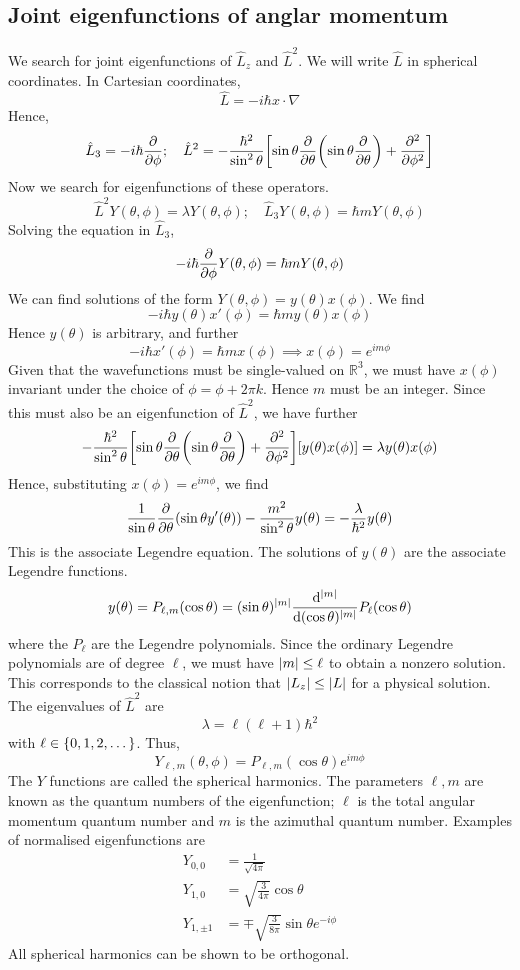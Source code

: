\subsection{Joint eigenfunctions of anglar momentum}
We search for joint eigenfunctions of \( \hat L_z \) and \( \hat L^2 \).
We will write \( \hat L \) in spherical coordinates.
In Cartesian coordinates,
\[
	\hat L = -i \hbar x \cdot \nabla
\]
Hence,
\[
	\hat L_3 = -i \hbar \pdv{\phi};\quad \hat L^2 = -\frac{\hbar^2}{\sin^2 \theta} \qty[\sin \theta \pdv{\theta} \qty(\sin \theta \pdv{\theta}) + \pdv[2]{\phi} ]
\]
Now we search for eigenfunctions of these operators.
\[
	\hat L^2 Y(\theta, \phi) = \lambda Y(\theta, \phi);\quad \hat L_3 Y(\theta, \phi) = \hbar m Y(\theta, \phi)
\]
Solving the equation in \( \hat L_3 \),
\[
	-i\hbar \pdv{\phi} Y(\theta, \phi) = \hbar m Y(\theta, \phi)
\]
We can find solutions of the form \( Y(\theta, \phi) = y(\theta)x(\phi) \).
We find
\[
	-i\hbar y(\theta) x'(\phi) = \hbar m y(\theta) x(\phi)
\]
Hence \( y(\theta) \) is arbitrary, and further
\[
	-i\hbar x'(\phi) = \hbar m x(\phi) \implies x(\phi) = e^{i m \phi}
\]
Given that the wavefunctions must be single-valued on \( \mathbb R^3 \), we must have \( x(\phi) \) invariant under the choice of \( \phi = \phi + 2\pi k \).
Hence \( m \) must be an integer.
Since this must also be an eigenfunction of \( \hat L^2 \), we have further
\[
	-\frac{\hbar^2}{\sin^2 \theta} \qty[\sin \theta \pdv{\theta} \qty(\sin \theta \pdv{\theta}) + \pdv[2]{\phi} ] [y(\theta) x(\phi)] = \lambda y(\theta) x(\phi)
\]
Hence, substituting \( x(\phi) = e^{i m \phi} \), we find
\[
	\frac{1}{\sin \theta} \pdv{\theta} \qty(\sin \theta y'(\theta)) - \frac{m^2}{\sin^2 \theta} y(\theta) = - \frac{\lambda}{\hbar^2} y(\theta)
\]
This is the associate Legendre equation.
The solutions of \( y(\theta) \) are the associate Legendre functions.
\[
	y(\theta) = P_{\ell,m}(\cos \theta) = (\sin \theta)^{\abs{m}} \dv[\abs{m}]{(\cos \theta)}  P_\ell(\cos \theta)
\]
where the \( P_\ell \) are the Legendre polynomials.
Since the ordinary Legendre polynomials are of degree \( \ell \), we must have \( \abs{m} \leq \ell \) to obtain a nonzero solution.
This corresponds to the classical notion that \( \abs{L_z} \leq \abs{L} \) for a physical solution.
The eigenvalues of \( \hat L^2 \) are
\[
	\lambda = \ell(\ell+1) \hbar^2
\]
with \( \ell \in \qty{0, 1, 2, \dots} \).
Thus,
\[
	Y_{\ell, m}(\theta, \phi) = P_{\ell,m}(\cos\theta) e^{im\phi}
\]
The \( Y \) functions are called the spherical harmonics.
The parameters \( \ell, m \) are known as the quantum numbers of the eigenfunction; \( \ell \) is the total angular momentum quantum number and \( m \) is the azimuthal quantum number.
Examples of normalised eigenfunctions are
\begin{align*}
	Y_{0,0}     & = \frac{1}{\sqrt{4 \pi}}                             \\
	Y_{1,0}     & = \sqrt{\frac{3}{4 \pi}} \cos \theta                 \\
	Y_{1,\pm 1} & = \mp \sqrt{\frac{3}{8 \pi}} \sin \theta e^{-i \phi}
\end{align*}
All spherical harmonics can be shown to be orthogonal.

